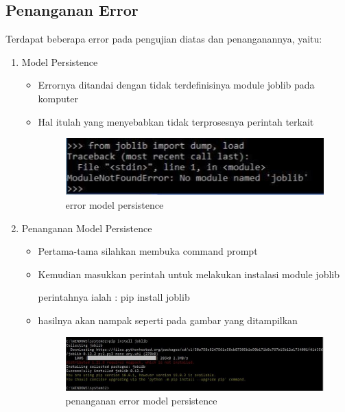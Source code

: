 \subsection{Penanganan Error}
Terdapat beberapa error pada pengujian diatas dan penanganannya, yaitu:
\begin{enumerate}
\item Model Persistence
\begin{itemize}
\item Errornya ditandai dengan tidak terdefinisinya module joblib pada komputer
\item Hal itulah yang menyebabkan tidak terprosesnya perintah terkait
\par

\begin{figure}[ht]
\centering
\includegraphics[scale=0.6]{figures/er.jpg}
\caption{error model persistence}
\label{contoh}
\end{figure}

\par
\par
\par
\end{itemize}
\item Penanganan Model Persistence
\begin{itemize}
\item Pertama-tama silahkan membuka command prompt
\item Kemudian masukkan perintah untuk melakukan instalasi module joblib
\par perintahnya ialah : pip install joblib
\item hasilnya akan nampak seperti pada gambar yang ditampilkan
\par

\begin{figure}[ht]
\centering
\includegraphics[scale=0.4]{figures/penanganan1.jpg}
\caption{penanganan error model persistence }
\label{contoh}
\end{figure}

\par
\end{itemize}
\end{enumerate}

